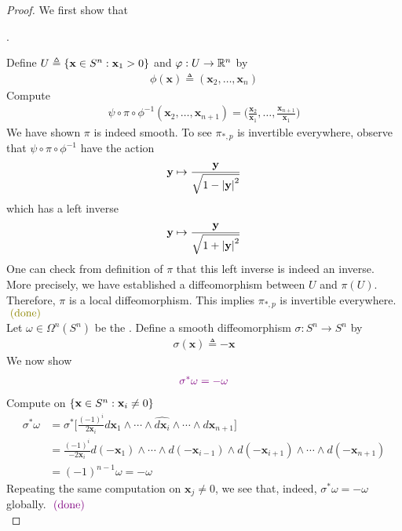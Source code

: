 \documentclass{report}
\begin{document}
\begin{proof}
We first show that
\begin{center}
   \begin{minipage}{0.9\linewidth}  
     . 
   \end{minipage}
\end{center}
Define $U\triangleq \{ \textbf{x}\in S^n: \textbf{x}_1>0 \}$ and $\varphi : U\rightarrow \mathbb{R}^n$ by 
\begin{align*}
\phi (\textbf{x})\triangleq (\textbf{x}_2 ,\dots , \textbf{x}_n)
\end{align*}
Compute 
\begin{align*}
\psi \circ \pi  \circ  \phi ^{-1} (\textbf{x}_2 ,\dots ,\textbf{x}_{n+1})=  \Big(\frac{\textbf{x}_2}{\textbf{x}_1},\dots , \frac{\textbf{x}_{n+1}}{\textbf{x}_1}\Big)
\end{align*}
We have shown $\pi $ is indeed smooth. To see $\pi _{*,p}$ is invertible everywhere, observe that $\psi \circ \pi  \circ   \phi^{-1}$ have the action 
\begin{align*}
\textbf{y}\mapsto  \frac{\textbf{y}}{\sqrt{1- \left|\textbf{y}\right|^2} }
\end{align*}
which has a left inverse 
\begin{align*}
\textbf{y}\mapsto \frac{\textbf{y}}{\sqrt{1+ \left|\textbf{y}\right|^2} }
\end{align*}
One can check from definition of $\pi $ that this left inverse is indeed an inverse. More precisely, we have established a diffeomorphism between $U$ and $\pi  (U)$. Therefore, $\pi$ is a local diffeomorphism. This implies $\pi _{*,p}$ is invertible everywhere. $\odone$ \\

 Let $\omega \in \Omega^n (S^n)$ be the . Define a smooth diffeomorphism $\sigma :S^n\rightarrow S^n$ by 
\begin{align*}
\sigma (\textbf{x})\triangleq - \textbf{x}
\end{align*}
We now show 
\begin{align}
\label{sgw}
  \textcolor{violet}{\sigma^* \omega = - \omega}
\end{align}
Compute on $\{ \textbf{x} \in S^n : \textbf{x}_i \neq 0 \} $
\begin{align*}
  \sigma^* \omega &=  \sigma^*  \Big[\frac{(-1)^i}{2\textbf{x}_i} d\textbf{x}_1 \wedge  \cdots \wedge \widehat{d \textbf{x}_i} \wedge \cdots \wedge  d\textbf{x}_{n+1}  \Big] \\
  &= \frac{(-1)^i}{-2\textbf{x}_i}d(-\textbf{x}_1)\wedge  \cdots \wedge  d(-\textbf{x}_{i-1}) \wedge  d(-\textbf{x}_{i+1}) \wedge  \cdots \wedge   d(-\textbf{x}_{n+1})    \\
  &=(-1)^{n-1} \omega=-\omega 
\end{align*}
Repeating the same computation on $\textbf{x}_j \neq 0$, we see that, indeed, $\sigma^* \omega= -\omega$ globally. $\textcolor{violet}{\text{ (done) }}$\\



\end{proof}
\end{document}
